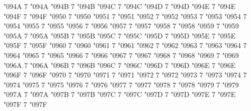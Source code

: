 \Umathcode "094A 7 \symoperators "094A%
\Umathcode "094B 7 \symoperators "094B%
\Umathcode "094C 7 \symoperators "094C%
\Umathcode "094D 7 \symoperators "094D%
\Umathcode "094E 7 \symoperators "094E%
\Umathcode "094F 7 \symoperators "094F%
%
\Umathcode "0950 7 \symoperators "0950%
\Umathcode "0951 7 \symoperators "0951%
\Umathcode "0952 7 \symoperators "0952%
\Umathcode "0953 7 \symoperators "0953%
\Umathcode "0954 7 \symoperators "0954%
\Umathcode "0955 7 \symoperators "0955%
\Umathcode "0956 7 \symoperators "0956%
\Umathcode "0957 7 \symoperators "0957%
\Umathcode "0958 7 \symoperators "0958%
\Umathcode "0959 7 \symoperators "0959%
\Umathcode "095A 7 \symoperators "095A%
\Umathcode "095B 7 \symoperators "095B%
\Umathcode "095C 7 \symoperators "095C%
\Umathcode "095D 7 \symoperators "095D%
\Umathcode "095E 7 \symoperators "095E%
\Umathcode "095F 7 \symoperators "095F%
%
\Umathcode "0960 7 \symoperators "0960%
\Umathcode "0961 7 \symoperators "0961%
\Umathcode "0962 7 \symoperators "0962%
\Umathcode "0963 7 \symoperators "0963%
\Umathcode "0964 7 \symoperators "0964%
\Umathcode "0965 7 \symoperators "0965%
\Umathcode "0966 7 \symoperators "0966%
\Umathcode "0967 7 \symoperators "0967%
\Umathcode "0968 7 \symoperators "0968%
\Umathcode "0969 7 \symoperators "0969%
\Umathcode "096A 7 \symoperators "096A%
\Umathcode "096B 7 \symoperators "096B%
\Umathcode "096C 7 \symoperators "096C%
\Umathcode "096D 7 \symoperators "096D%
\Umathcode "096E 7 \symoperators "096E%
\Umathcode "096F 7 \symoperators "096F%
%
\Umathcode "0970 7 \symoperators "0970%
\Umathcode "0971 7 \symoperators "0971%
\Umathcode "0972 7 \symoperators "0972%
\Umathcode "0973 7 \symoperators "0973%
\Umathcode "0974 7 \symoperators "0974%
\Umathcode "0975 7 \symoperators "0975%
\Umathcode "0976 7 \symoperators "0976%
\Umathcode "0977 7 \symoperators "0977%
\Umathcode "0978 7 \symoperators "0978%
\Umathcode "0979 7 \symoperators "0979%
\Umathcode "097A 7 \symoperators "097A%
\Umathcode "097B 7 \symoperators "097B%
\Umathcode "097C 7 \symoperators "097C%
\Umathcode "097D 7 \symoperators "097D%
\Umathcode "097E 7 \symoperators "097E%
\Umathcode "097F 7 \symoperators "097F%


